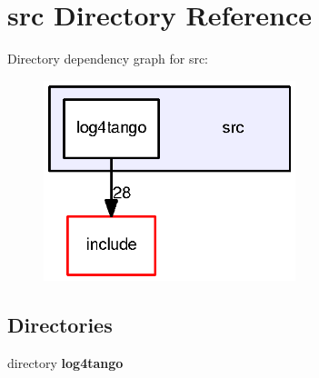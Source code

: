 \section{src Directory Reference}
\label{dir_78244b5185d24cf371332fad27b7cb3b}
Directory dependency graph for src\-:
\nopagebreak
\begin{figure}[H]
\begin{center}
\leavevmode
\includegraphics[width=208pt]{dir_78244b5185d24cf371332fad27b7cb3b_dep}
\end{center}
\end{figure}
\subsection*{Directories}
\begin{DoxyCompactItemize}
\item 
directory {\bf log4tango}
\end{DoxyCompactItemize}
